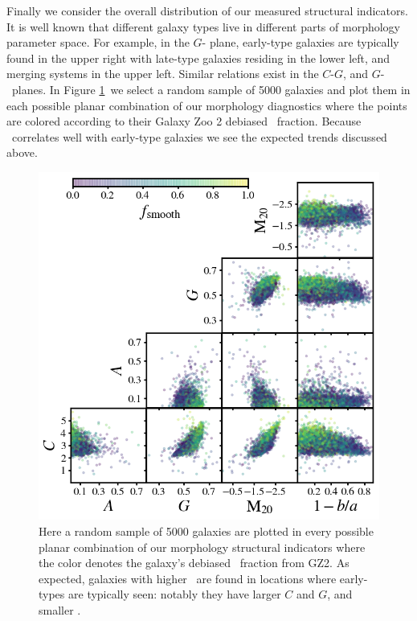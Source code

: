 
Finally we consider the overall distribution of our measured structural indicators. It is well known that different galaxy types live in different parts of morphology parameter space. For example, in the $G$- plane, early-type galaxies are typically found in the upper right with late-type galaxies residing in the lower left, and merging systems in the upper left. Similar relations exist in the $C$-$G$, and $G$-~planes. In Figure \ref{fig: morphs as a fcn of fsmooth}~we select a random sample of 5000 galaxies and plot them in each possible planar combination of our morphology diagnostics where the points are colored according to their Galaxy Zoo 2 debiased \fsmooth~fraction. Because \fsmooth~correlates well with early-type galaxies we see the expected trends discussed above. 

\begin{figure}
\centering
\includegraphics[width=5in]{Figures/morph_params_random_sample_fsmooth_colored_clean.png}
\caption[Automated morphologies as a function of Galaxy Zoo 2 \fsmooth]{Here a random sample of 5000 galaxies are plotted in every possible planar combination of our morphology structural indicators where the color denotes the galaxy's debiased \fsmooth~fraction from GZ2. As expected, galaxies with higher \fsmooth~are found in locations where early-types are typically seen: notably they have larger $C$ and $G$, and smaller .}
\label{fig: morphs as a fcn of fsmooth}
\end{figure}


